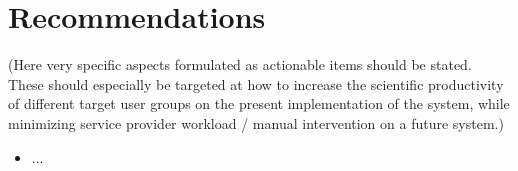 \section{Recommendations}

(Here very specific aspects formulated as actionable items should be stated. These should especially be targeted at how to increase the scientific productivity of different target user groups on the present implementation of the system, while minimizing service provider workload / manual intervention on a future system.)

\begin{itemize}
  \item ...
\end{itemize}
